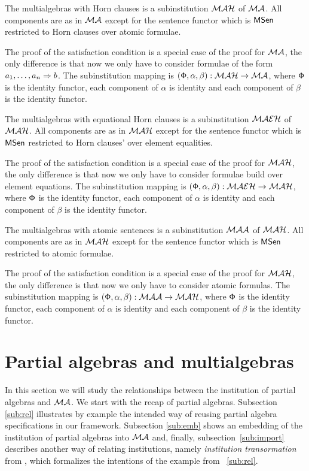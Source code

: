 \documentclass[10pt]{article}
\begin{document}
\begin{fact}\label{fa:mahinst}
The multialgebras with Horn clauses is a subinstitution ${\mathcal{MAH}}$ of
${\mathcal{MA}}$. All components are as in ${\mathcal{MA}}$ except for the sentence
functor  which is ${\sf {MSen}}$ restricted to Horn clauses over
atomic formulae.
\end{fact}
The proof of the satisfaction condition is a special case of the proof for
${\mathcal{MA}}$, the only difference is that now we only have to consider
formulae of the form $a_1, \ldots , a_n \Rightarrow b$.  The subinstitution
mapping is $({\sf {\Phi}},\alpha,\beta): {\mathcal{MAH}} \to {\mathcal{MA}}$, where
${\sf {\Phi}}$ is the identity functor, each component of $\alpha$ is identity
and each component of $\beta$ is the identity functor.


\begin{fact}\label{fa:maeh}
The multialgebras with equational Horn clauses is a subinstitution ${\mathcal{MAEH}}$ of
${\mathcal{MAH}}$. All components are as in ${\mathcal{MAH}}$ except for the sentence
functor  which is ${\sf {MSen}}$ restricted to Horn clauses' over element equalities.
\end{fact}
The proof of the satisfaction condition is a special case of the proof for
${\mathcal{MAH}}$,
the only difference is that now we only have to consider formulae build over element equations.
The subinstitution mapping is $({\sf {\Phi}},\alpha,\beta): {\mathcal{MAEH}} \to
{\mathcal{MAH}}$, where ${\sf {\Phi}}$ is the identity functor, each component of
$\alpha$ is identity and each component of $\beta$ is the
identity functor.

\begin{fact}\label{fa:maa}
The multialgebras with atomic sentences is a subinstitution ${\mathcal{MAA}}$ of
${\mathcal{MAH}}$. All components are as in ${\mathcal{MAH}}$ except for the sentence
functor  which is ${\sf {MSen}}$ restricted to
atomic formulae.
\end{fact}
The proof of the satisfaction condition is a special case of the proof for
${\mathcal{MAH}}$, the only difference is that now we only have to consider atomic
formulas.  The subinstitution mapping is $({\sf {\Phi}},\alpha,\beta):
{\mathcal{MAA}} \to {\mathcal{MAH}}$, where ${\sf {\Phi}}$ is the identity functor, each
component of $\alpha$ is identity and each component of
$\beta$ is the identity functor.


\section{Partial algebras and multialgebras}\label{se:partial}
In this section we will study the relationships between the institution of
partial algebras and ${\mathcal{MA}}$. We start with the recap of partial
algebras. Subsection \ref{sub:rel} illustrates by example the intended way of
reusing partial algebra specifications in our framework. Subsection
\ref{sub:emb} shows an embedding of the institution of partial algebras into
${\mathcal{MA}}$ and, finally, subsection~\ref{sub:import} describes another way of
relating institutions, namely {\em institution transormation} from \cite{system}, which
formalizes the intentions of the example from ~\ref{sub:rel}.
\end{document}

